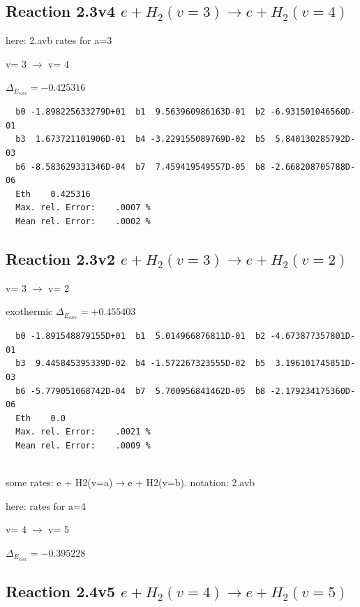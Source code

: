 \documentclass[12pt,dvipdfmx]{article}
\begin{document}
\newpage


\subsection{
Reaction 2.3v4
$ e + H_2(v=3) \rightarrow e + H_2(v=4) $
}
here: 2.avb rates for a=3

  v=  3 $\rightarrow$ v= 4

$\Delta_{E_{elec}}=-0.425316$



\begin{small}\begin{verbatim}
  b0 -1.898225633279D+01  b1  9.563960986163D-01  b2 -6.931501046560D-01
  b3  1.673721101906D-01  b4 -3.229155089769D-02  b5  5.840130285792D-03
  b6 -8.583629331346D-04  b7  7.459419549557D-05  b8 -2.668208705788D-06
  Eth    0.425316
  Max. rel. Error:    .0007 %
  Mean rel. Error:    .0002 %

\end{verbatim}\end{small}


\subsection{
Reaction 2.3v2
$ e + H_2(v=3) \rightarrow e + H_2(v=2) $
}

  v=  3 $\rightarrow$ v= 2

exothermic
$\Delta_{E_{elec}}=+0.455403$


\begin{small}\begin{verbatim}
  b0 -1.891548879155D+01  b1  5.014966876811D-01  b2 -4.673877357801D-01
  b3  9.445845395339D-02  b4 -1.572267323555D-02  b5  3.196101745851D-03
  b6 -5.779051068742D-04  b7  5.700956841462D-05  b8 -2.179234175360D-06
  Eth    0.0
  Max. rel. Error:    .0021 %
  Mean rel. Error:    .0009 %


\end{verbatim}\end{small}

\newpage
some rates: e + H2(v=a)$\rightarrow$e + H2(v=b). notation: 2.avb

here: rates for a=4

  v=  4 $\rightarrow$ v= 5

$\Delta_{E_{elec}}=-0.395228$

\subsection{
Reaction 2.4v5
$ e + H_2(v=4) \rightarrow e + H_2(v=5) $
}
\end{document}
